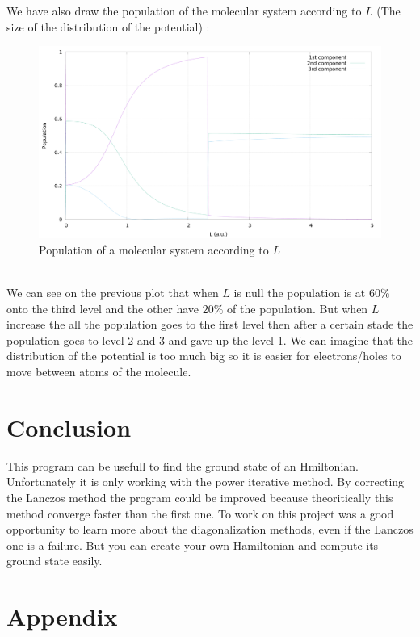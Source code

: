 \documentclass[1pt, a4paper]{article}
\begin{document}
We have also draw the population of the molecular system according to $L$ (The size of the distribution of the potential) :
\begin{figure}[htbp]
    \centering
    \includegraphics[width=.70\linewidth]{wavefunction_Hmol.pdf}
    \caption{Population of a molecular system according to $L$}
    \label{fig:H3LVL}
\end{figure}\\
We can see on the previous plot that when $L$ is null the population is at $60\%$ onto the third level and the other have $20\%$ of the population. But when $L$ increase the all the population goes to the first level then after a certain stade the population goes to level 2 and 3 and gave up the level 1. We can imagine that the distribution of the potential is too much big so it is easier for electrons/holes to move between atoms of the molecule.
\newpage
\section{Conclusion}
\label{sec:conclusion}
\noindent
This program can be usefull to find the ground state of an Hmiltonian. Unfortunately it is only working with the power iterative method. By correcting the Lanczos method the program could be improved because theoritically this method converge faster than the first one. To work on this project was a good opportunity to learn more about the diagonalization methods, even if the Lanczos one is a failure. But you can create your own Hamiltonian and compute its ground state easily.  
\newpage
\section{Appendix}
\label{app:app}
\end{document}
